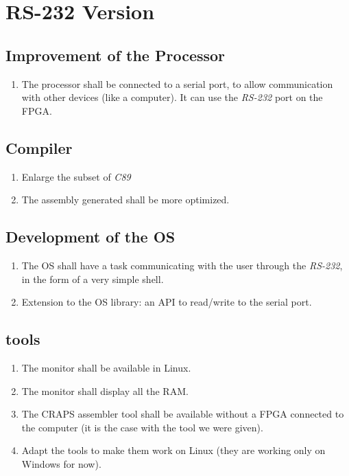 \documentclass{article}
\begin{document}
    \section{RS-232 Version}

      \subsection{Improvement of the Processor}
        \begin{enumerate}
          \item The processor shall be connected to a serial port, to allow
            communication with other devices (like a computer). It can use the
            \textit{RS-232} port on the FPGA.
        \end{enumerate}

      \subsection{Compiler}
        \begin{enumerate}
          \item Enlarge the subset of \textit{C89}
          \item The assembly generated shall be more optimized.
        \end{enumerate}

      \subsection{Development of the OS}
        \begin{enumerate}
          \item The OS shall have a task communicating with the user through
            the \textit{RS-232}, in the form of a very simple shell.
          \item Extension to the OS library: an API to read/write to the serial
            port.
        \end{enumerate}
      \subsection{tools}
        \begin{enumerate}
          \item The monitor shall be available in Linux.
          \item The monitor shall display all the RAM.
          \item The CRAPS assembler tool shall be available without a FPGA connected to the computer (it is the case with the tool we were given).
          \item Adapt the tools to make them work on Linux (they are working only on Windows for now).
        \end{enumerate}
\end{document}
